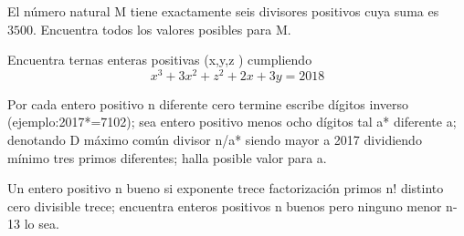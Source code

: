 \begin{problem}[OMMEB 2017]
    El número natural M tiene exactamente seis divisores positivos 
    cuya suma es \(3500\). Encuentra todos los valores posibles para M.
\end{problem}

\begin{problem}[OMMEB 2017]
    Encuentra ternas enteras positivas (x,y,z ) cumpliendo 
    \[x^3+3x^2+z^2+2x+3y=2018\]
\end{problem}

\begin{problem}[OMMEB 2017]
    Por cada entero positivo n diferente cero termine escribe 
    dígitos inverso (ejemplo:2017*=7102); sea entero positivo menos 
    ocho dígitos tal a* diferente a; denotando D máximo común divisor 
    n/a* siendo mayor a 2017 dividiendo mínimo tres primos diferentes; 
    halla posible valor para a.  
\end{problem}

\begin{problem}[OMMEB 2017]
    Un entero positivo n bueno si exponente trece factorización 
    primos n! distinto cero divisible trece; encuentra enteros 
    positivos n buenos pero ninguno menor n-13 lo sea.
\end{problem}   
